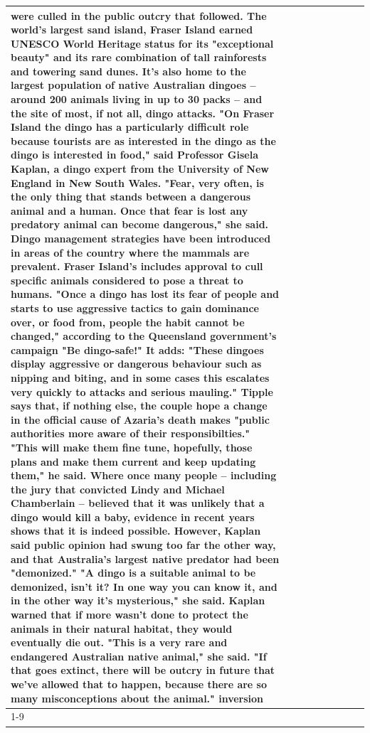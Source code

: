 \begin{table}[H]
\begin{tabular}{lllrlllll}
were culled in the public outcry that followed. The world's largest sand island, Fraser Island earned UNESCO World Heritage status for its "exceptional beauty" and its rare combination of tall rainforests and towering sand dunes. It's also home to the largest population of native Australian dingoes -- around 200 animals living in up to 30 packs -- and the site of most, if not all, dingo attacks. "On Fraser Island the dingo has a particularly difficult role because tourists are as interested in the dingo as the dingo is interested in food," said Professor Gisela Kaplan, a dingo expert from the University of New England in New South Wales. "Fear, very often, is the only thing that stands between a dangerous animal and a human. Once that fear is lost any predatory animal can become dangerous," she said. Dingo management strategies have been introduced in areas of the country where the mammals are prevalent. Fraser Island's includes approval to cull specific animals considered to pose a threat to humans. "Once a dingo has lost its fear of people and starts to use aggressive tactics to gain dominance over, or food from, people the habit cannot be changed," according to the Queensland government's campaign "Be dingo-safe!" It adds: "These dingoes display aggressive or dangerous behaviour such as nipping and biting, and in some cases this escalates very quickly to attacks and serious mauling." Tipple says that, if nothing else, the couple hope a change in the official cause of Azaria's death makes "public authorities more aware of their responsibilties." "This will make them fine tune, hopefully, those plans and make them current and keep updating them," he said. Where once many people -- including the jury that convicted Lindy and Michael Chamberlain -- believed that it was unlikely that a dingo would kill a baby, evidence in recent years shows that it is indeed possible. However, Kaplan said public opinion had swung too far the other way, and that Australia's largest native predator had been "demonized." "A dingo is a suitable animal to be demonized, isn't it? In one way you can know it, and in the other way it's mysterious," she said. Kaplan warned that if more wasn't done to protect the animals in their natural habitat, they would eventually die out. "This is a very rare and endangered Australian native animal," she said. "If that goes extinct, there will be outcry in future that we've allowed that to happen, because there are so many misconceptions about the animal." inversion \\
\cline{1-9}

\end{tabular}
\end{table}
